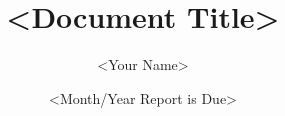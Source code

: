 \documentclass{cdtcommsreport}
\title{<Document Title>}
\author{<Your Name>}
\date{<Month/Year Report is Due>}
\begin{document}
\frontpage
\statements

\tables
\maincontent




\end{document}
